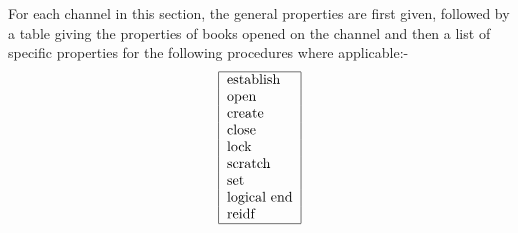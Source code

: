 For each channel in this section, the general properties are first
given, followed by a table giving the properties of books opened on the
channel and then a list of specific properties for the following
procedures where applicable:-
$$\begin{tabular}{|l|}\hline
  establish\\
  open\\
  create\\
  close\\
  lock\\
  scratch\\
  set\\
  logical end\\
  reidf\\ \hline
  \end{tabular}
$$
